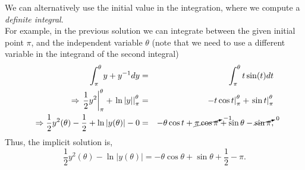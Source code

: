 \documentclass[11pt]{article}
\begin{document}
\begin{solution}
We can alternatively use the initial value in the integration, where we compute a \textit{definite integral}. \\
For example, in the previous solution we can integrate between the given initial point $\pi$, and the independent variable $\theta$ (note that we need to use a different variable in the integrand of the second integral)
\begin{eqnarray*}
\int_{\pi}^{\theta} y + y^{-1} dy & = &  \int_{\pi}^{\theta} t \sin(t) dt \\
\Rightarrow \left. \frac{1}{2}y^{2} \right|_{\pi}^{\theta} + \left. \ln |y| \right|_{\pi}^{\theta} & = &\left. -t \cos t \right|_{\pi}^{\theta} + \left. \sin t \right|_{\pi}^{\theta} \\
\Rightarrow \frac{1}{2} y^{2}(\theta) - \frac{1}{2} +\ln |y(\theta)| - 0 & = & -\theta \cos t + \cancelto{{\scriptstyle -1}}{ \pi \cos \pi} + \sin \theta - \cancelto{\scriptstyle 0}{\sin \pi} ,
\end{eqnarray*}
Thus, the implicit solution is,
\begin{equation*}
\boxed{ \frac{1}{2}y^{2}(\theta) -\ln |y(\theta)| = -\theta \cos\theta + \sin \theta +\frac{1}{2} -\pi }.
\end{equation*}

\end{solution}
\end{document}

